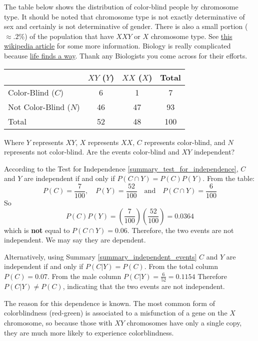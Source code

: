 \begin{example}\label{example_independence_color_blindness}
    The table below shows the distribution of color-blind people by chromosome type. It should be noted that chromosome type is not exactly determinative of sex and certainly is not determinative of gender. There is also a small portion ($\approx .2\%$) of the population that have $XXY$ or $X$ chromosome type. See \href{https://en.wikipedia.org/wiki/XY_sex-determination_system}{this wikipedia article} for some more information. Biology is really complicated because \href{https://youtu.be/kiVVzxoPTtg?si=AdO-PvNUPxFgz4sf}{life finds a way}. Thank any Biologists you come across for their efforts.
    \begin{center}
        \begin{tabular}{|l|cc|c|}
            \hline
                                  & $XY$ ($Y$) & $XX$ ($X$) & Total \\
            \hline
            Color-Blind ($C$)     & 6          & 1          & 7     \\
            Not Color-Blind ($N$) & 46         & 47         & 93    \\
            \hline
            Total                 & 52         & 48         & 100   \\
            \hline
        \end{tabular}
    \end{center}
    Where $Y$ represents $XY$, $X$ represents $XX$, $C$ represents color-blind, and $N$ represents not color-blind. Are the events color-blind and $XY$ independent?
\end{example}

\begin{solution}
    According to the Test for Independence \ref{summary_test_for_independence}, $C$ and $Y$ are independent if and only if \( P(C \cap Y) = P(C)P(Y) \).
    From the table:
    \[ P(C) = \frac{7}{100}, \quad P(Y) = \frac{52}{100} \quad \text{and} \quad P(C \cap Y) = \frac{6}{100} \]
    So
    \[ P(C)P(Y) = \left(\frac{7}{100}\right)\left(\frac{52}{100}\right) = 0.0364 \]
    which is \textbf{not} equal to \( P(C \cap Y) = 0.06 \).
    Therefore, the two events are not independent. We may say they are dependent.

    Alternatively, using Summary \ref{summary_independent_events} $C$ and $Y$ are independent if and only if \( P(C|Y) = P(C) \).
    From the total column \( P(C) = 0.07 \).
    From the male column \( P(C|Y) = \frac{6}{52} = 0.1154 \)
    Therefore \( P(C|Y) \neq P(C) \), indicating that the two events are not independent.

    The reason for this dependence is known. The most common form of colorblindness (red-green) is associated to a misfunction of a gene on the $X$ chromosome, so because those with $XY$ chromosomes have only a single copy, they are much more likely to experience colorblindness.
\end{solution}

